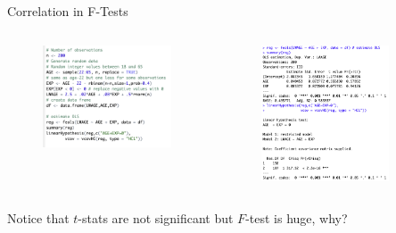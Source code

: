 \begin{frame}{Correlation in F-Tests}
\begin{columns}
\begin{column}{0.5\textwidth}
\begin{figure}
\flushleft
	\includegraphics [width=\textwidth]	{correlation_code}
\end{figure}

\end{column}
\begin{column}{0.5\textwidth}
\begin{figure}
\flushleft
	\includegraphics [width=0.8\textwidth]	{correlation_test}
\end{figure}
\end{column}
\end{columns}
Notice that $t$-stats are not significant but $F$-test is huge, why?
\end{frame}



